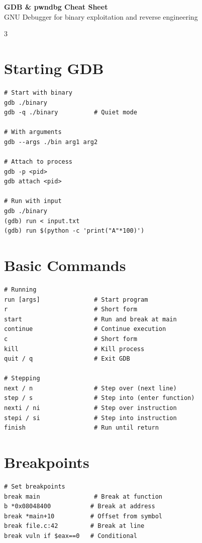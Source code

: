 \documentclass[10pt,landscape,a4paper]{article}
\begin{document}
\begin{center}
    {\Huge\bfseries\color{sectioncolor} GDB \& pwndbg Cheat Sheet}\\
    \vspace{0.2cm}
    {\large GNU Debugger for binary exploitation and reverse engineering}
\end{center}

\begin{multicols}{3}
\setlength{\premulticols}{1pt}
\setlength{\postmulticols}{1pt}
\setlength{\multicolsep}{1pt}
\setlength{\columnsep}{1.5em}

\section*{Starting GDB}
\begin{lstlisting}
# Start with binary
gdb ./binary
gdb -q ./binary          # Quiet mode

# With arguments
gdb --args ./bin arg1 arg2

# Attach to process
gdb -p <pid>
gdb attach <pid>

# Run with input
gdb ./binary
(gdb) run < input.txt
(gdb) run $(python -c 'print("A"*100)')
\end{lstlisting}

\section*{Basic Commands}
\begin{lstlisting}
# Running
run [args]               # Start program
r                        # Short form
start                    # Run and break at main
continue                 # Continue execution
c                        # Short form
kill                     # Kill process
quit / q                 # Exit GDB

# Stepping
next / n                 # Step over (next line)
step / s                 # Step into (enter function)
nexti / ni               # Step over instruction
stepi / si               # Step into instruction
finish                   # Run until return
\end{lstlisting}

\section*{Breakpoints}
\begin{lstlisting}
# Set breakpoints
break main               # Break at function
b *0x08048400           # Break at address
break *main+10          # Offset from symbol
break file.c:42         # Break at line
break vuln if $eax==0   # Conditional


\end{lstlisting}
\end{multicols}
\end{document}
